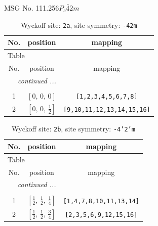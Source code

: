 \documentclass[fleqn,8pt]{jsarticle}
\begin{document}
\setcounter{MaxMatrixCols}{32}

\renewcommand{\tablename}{Table~}
\renewcommand{\figurename}{Figure~}
\begin{center}
\LARGE
MSG No. 111.256\quad$P_{c}\bar{4}2m$
\end{center}
\renewcommand{\arraystretch}{1.2}
\begin{longtable}{ccc}
\caption{Wyckoff site: {\tt 2a}, site symmetry: {\tt -42m}}
 \\
 \hline \hline
No. & position & mapping \\ \hline \endfirsthead

\multicolumn{2}{l}{\tablename\ \thetable{}} \\
 \hline \hline
No. & position & mapping \\ \hline \endhead

 \hline \hline
\multicolumn{2}{r}{\footnotesize\it continued ...} \\ \endfoot

 \hline \hline
\multicolumn{2}{r}{} \\ \endlastfoot

1 & $\left[ 0,\, 0,\, 0 \right]$ & {\tt [1,2,3,4,5,6,7,8]} \\ \hline
2 & $\left[ 0,\, 0,\, \frac{1}{2} \right]$ & {\tt [9,10,11,12,13,14,15,16]} \\
\end{longtable}
\renewcommand{\arraystretch}{1.2}
\begin{longtable}{ccc}
\caption{Wyckoff site: {\tt 2b}, site symmetry: {\tt -4'2'm}}
 \\
 \hline \hline
No. & position & mapping \\ \hline \endfirsthead

\multicolumn{2}{l}{\tablename\ \thetable{}} \\
 \hline \hline
No. & position & mapping \\ \hline \endhead

 \hline \hline
\multicolumn{2}{r}{\footnotesize\it continued ...} \\ \endfoot

 \hline \hline
\multicolumn{2}{r}{} \\ \endlastfoot

1 & $\left[ \frac{1}{2},\, \frac{1}{2},\, \frac{1}{4} \right]$ & {\tt [1,4,7,8,10,11,13,14]} \\ \hline
2 & $\left[ \frac{1}{2},\, \frac{1}{2},\, \frac{3}{4} \right]$ & {\tt [2,3,5,6,9,12,15,16]} \\
\end{longtable}
\end{document}
